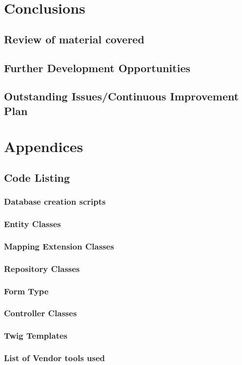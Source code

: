 \documentclass[a4paper,12pt]{article}
\begin{document}
\section {Conclusions}
\subsection {Review of material covered }
\subsection {Further Development Opportunities}
\subsection {Outstanding Issues/Continuous Improvement Plan}


\section {Appendices}
\subsection {Code Listing}

\subsubsection {Database creation scripts}
\subsubsection {Entity Classes}
\subsubsection {Mapping Extension Classes}
\subsubsection {Repository Classes}
\subsubsection {Form Type}
\subsubsection {Controller Classes}
\subsubsection {Twig Templates}
\subsubsection {List of Vendor tools used}
\newpage\printbibliography[title={Bibliography}]
\end{document}
